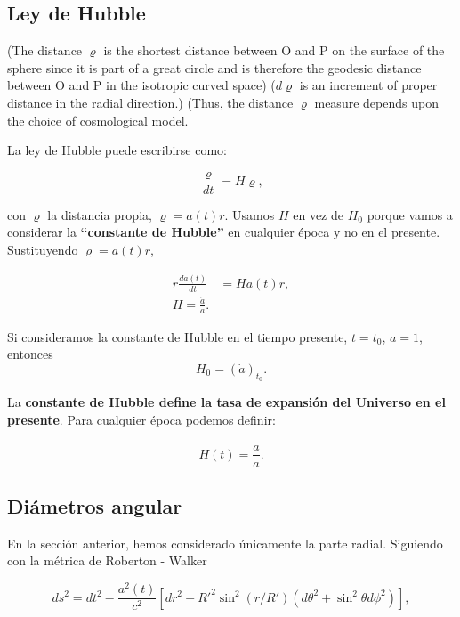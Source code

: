 \documentclass{article}
\begin{document}

\subsection{Ley de Hubble} 

(The distance $\varrho$ is the shortest distance between O and P on the surface of the sphere
since it is part of a great circle and is therefore the geodesic distance between O and
P in the isotropic curved space)
($d \varrho$ is an increment of proper distance in the radial direction.)
(Thus, the distance $\varrho$ measure depends upon the choice of cosmological model.

La ley de Hubble puede escribirse como: 


 \begin{equation}
        \frac{\varrho}{dt} = H\varrho,
    \end{equation}

con $\varrho$ la distancia propia, $\varrho = a(t) r$. Usamos $H$ en vez de $H_0$ porque vamos a considerar la {\bf{``constante de Hubble''}} en cualquier época y no en el presente. Sustituyendo $\varrho = a(t) r$,

    \begin{align}
        r\frac{da(t)}{dt} & = Ha(t)r, \\
        H = \frac{\dot{a}}{a}.
    \end{align}

Si consideramos la constante de Hubble en el tiempo presente, $t= t_0$, $a=1$, entonces 
    \begin{equation}
        H_0 = (\dot{a})_{t_0}.
    \end{equation}

La {\bf{constante de Hubble define la tasa de expansión del Universo en el presente}}. Para cualquier época podemos definir: 

    \begin{equation}
        H(t) = \frac{\dot{a}}{a}.
    \end{equation}

\subsection{Diámetros angular}

En la sección anterior, hemos considerado únicamente la parte radial. Siguiendo con la métrica de Roberton - Walker 

        $$ds^2 = dt^2 - \frac{a^2(t)}{c^2} [dr^2 + R'^2 \sin^2(r/R')(d \theta^2 + \sin^2 \theta d\phi^2)],$$
  
\end{document}
